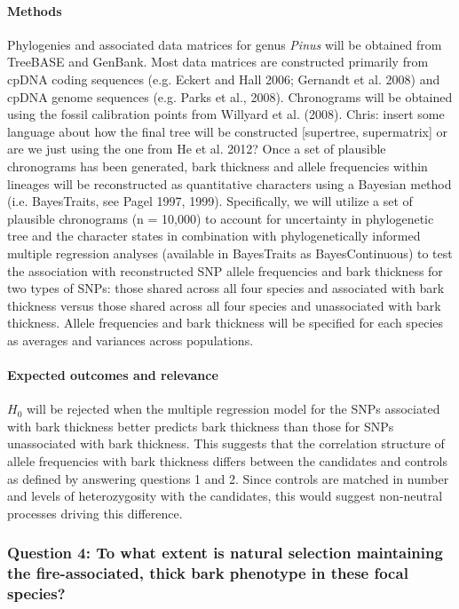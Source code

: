 \paragraph{Methods} Phylogenies and associated data matrices for genus \emph{Pinus} will be obtained from 
TreeBASE and GenBank. Most data matrices are constructed primarily from cpDNA coding sequences 
(e.g. Eckert and Hall 2006; Gernandt et al. 2008) and cpDNA genome sequences (e.g. Parks et al., 2008). 
Chronograms will be obtained using the fossil calibration points from Willyard et al. (2008). 
{Chris: insert some language about how the final tree will be constructed [supertree, supermatrix] 
or are we just using the one from He et al. 2012?} Once a set of plausible chronograms has been 
generated, bark thickness and allele frequencies within lineages will be reconstructed as quantitative 
characters using a Bayesian method (i.e. BayesTraits, see Pagel 1997, 1999). 
Specifically, we will utilize a set of plausible chronograms (n =  10,000) to account for uncertainty in 
phylogenetic tree and the character states in combination with phylogenetically informed multiple 
regression analyses (available in BayesTraits as BayesContinuous) to test the association with 
reconstructed SNP allele frequencies and bark thickness for two types of SNPs: those shared across 
all four species and associated with bark thickness versus those shared across all four species and 
unassociated with bark thickness. Allele frequencies and bark thickness will be specified for each species 
as averages and variances across populations.

\paragraph{Expected outcomes and relevance} $H_0$ will be rejected when the multiple regression model for the 
SNPs associated with bark thickness better predicts bark thickness than those for SNPs unassociated with bark thickness. 
This suggests that the correlation structure of allele frequencies with bark thickness differs between the candidates and controls 
as defined by answering questions 1 and 2. Since controls are matched in number and levels of heterozygosity with the candidates, 
this would suggest non-neutral processes driving this difference.

\subsubsection*{Question 4: To what extent is natural selection maintaining the fire-associated, thick bark phenotype in these focal species?}

